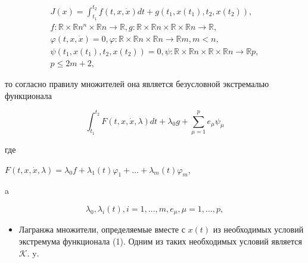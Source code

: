 \documentclass[10pt]{article}
\begin{document}
\[

\begin{gathered}

J(x)=\int_{t_{1}}^{t_{2}} f(t, x, \dot{x}) d t+g\left(t_{1}, x\left(t_{1}\right), t_{2}, x\left(t_{2}\right)\right), \\

f: \mathbb{R} \times \mathbb{R} n^{n} \times \mathbb{R} n \longrightarrow \mathbb{R}, g: \mathbb{R} \times \mathbb{R} n \times \mathbb{R} \times \mathbb{R} n \longrightarrow \mathbb{R}, \\

\varphi(t, x, \dot{x})=0, \varphi: \mathbb{R} \times \mathbb{R} n \times \mathbb{R} n \longrightarrow \mathbb{R} m, m<n, \\

\psi\left(t_{1}, x\left(t_{1}\right), t_{2}, x\left(t_{2}\right)\right)=0, \psi: \mathbb{R} \times \mathbb{R} n \times \mathbb{R} \times \mathbb{R} n \longrightarrow \mathbb{R} p, \\

p \leqslant 2 m+2,

\end{gathered}

\]



то согласно правилу множителей она является безусловной экстремалью функционала



\[

\int_{t_{1}}^{t_{2}} F(t, x, \dot{x}, \lambda) d t+\lambda_{0} g+\sum_{\mu=1}^{p} e_{\mu} \psi_{\mu}

\]



где



$F(t, x, \dot{x}, \lambda)=\lambda_{0} f+\lambda_{1}(t) \varphi_{1}+\ldots+\lambda_{m}(t) \varphi_{m}$,



a



\[

\lambda_{0}, \lambda_{i}(t), i=1, \ldots, m, e_{\mu}, \mu=1, \ldots, p,

\]



\begin{itemize}

  \item Лагранжа множители, определяемые вместе с $x(t)$ из необходимых условий экстремума функционала (1). Одним из таких необходимых условий является $\mathcal{K}$. $\mathrm{y}$.

\end{itemize}
\end{document}
